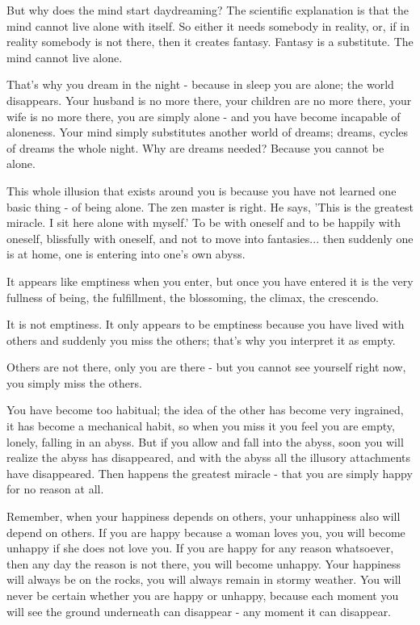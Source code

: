 But why does the mind start daydreaming? The scientific explanation is that the mind cannot live alone with itself. So either it needs somebody in reality, or, if in reality somebody is not there, then it creates fantasy. Fantasy is a substitute. The mind cannot live alone.

That's why you dream in the night - because in sleep you are alone; the world disappears. Your husband is no more there, your children are no more there, your wife is no more there, you are simply alone - and you have become incapable of aloneness. Your mind simply substitutes another world of dreams; dreams, cycles of dreams the whole night. Why are dreams needed? Because you cannot be alone.

This whole illusion that exists around you is because you have not learned one basic thing - of being alone. The zen master is right. He says, 'This is the greatest miracle. I sit here alone with myself.' To be with oneself and to be happily with oneself, blissfully with oneself, and not to move into fantasies... then suddenly one is at home, one is entering into one's own abyss.

It appears like emptiness when you enter, but once you have entered it is the very fullness of being, the fulfillment, the blossoming, the climax, the crescendo.

It is not emptiness. It only appears to be emptiness because you have lived with others and suddenly you miss the others; that's why you interpret it as empty.

Others are not there, only you are there - but you cannot see yourself right now, you simply miss the others.

You have become too habitual; the idea of the other has become very ingrained, it has become a mechanical habit, so when you miss it you feel you are empty, lonely, falling in an abyss. But if you allow and fall into the abyss, soon you will realize the abyss has disappeared, and with the abyss all the illusory attachments have disappeared. Then happens the greatest miracle - that you are simply happy for no reason at all.

Remember, when your happiness depends on others, your unhappiness also will depend on others. If you are happy because a woman loves you, you will become unhappy if she does not love you. If you are happy for any reason whatsoever, then any day the reason is not there, you will become unhappy. Your happiness will always be on the rocks, you will always remain in stormy weather. You will never be certain whether you are happy or unhappy, because each moment you will see the ground underneath can disappear - any moment it can disappear.

